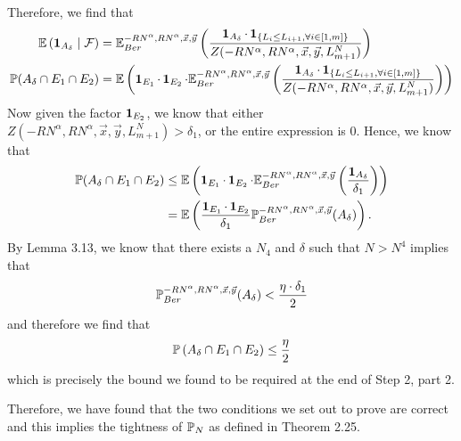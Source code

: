 	Therefore, we find that 
	\begin{align*}
	\mathbb{E}\left(\operatorname{\mathbf{1}}_{A_\delta}\mid \mathcal{F}\right)&=\mathbb{E}_{Ber}^{-RN^\alpha, RN^\alpha,\vec x,\vec y}\left(\frac{\operatorname{\mathbf{1}}_{A_\delta}\cdot \operatorname{\mathbf{1}}_{\left\{L_i\leq L_{i+1},\forall i\in [1,m]\right\}}}{Z(-RN^\alpha,RN^\alpha,\vec x, \vec y, L_{m+1}^N)}\right)
	\\
	\mathbb{P}(A_\delta\cap E_1\cap E_2)&=\mathbb{E}\left(\operatorname{\mathbf{1}}_{E_1}\cdot\operatorname{\mathbf{1}}_{E_2}\cdot \mathbb{E}_{Ber}^{-RN^\alpha, RN^\alpha,\vec x,\vec y}\left(\frac{\operatorname{\mathbf{1}}_{A_\delta}\cdot \operatorname{\mathbf{1}}_{\left\{L_i\leq L_{i+1},\forall i\in [1,m]\right\}}}{Z(-RN^\alpha,RN^\alpha,\vec x, \vec y, L_{m+1}^N)}\right)\right)
	\end{align*}
	Now given the factor $\operatorname{\mathbf{1}}_{E_2}$, we know that either $Z(-RN^\alpha,RN^\alpha,\vec x,\vec y, L_{m+1}^N)>\delta_1$, or the entire expression is $0$. Hence, we know that 
	\begin{align*}
	\mathbb{P}(A_\delta\cap E_1\cap E_2)&\leq \mathbb{E}\left(\operatorname{\mathbf{1}}_{E_1}\cdot\operatorname{\mathbf{1}}_{E_2}\cdot\mathbb{E}_{Ber}^{-RN^\alpha,RN^\alpha,\vec x,\vec y}\left(\frac{\operatorname{\mathbf{1}}_{A_\delta}}{\delta_1}\right)\right)\\
	&=\mathbb{E}\left(\frac{\operatorname{\mathbf{1}}_{E_1}\cdot \operatorname{\mathbf{1}}_{E_2}}{\delta_1}\mathbb{P}_{Ber}^{-RN^\alpha,RN^\alpha,\vec x,\vec y}(A_\delta)\right).
	\end{align*}
	By Lemma 3.13, we know that there exists a $N_4$ and $\delta$ such that $N>N^4$ implies that
	\[\mathbb{P}_{Ber}^{-RN^\alpha,RN^\alpha,\vec x,\vec y}(A_\delta)<\frac{\eta\cdot\delta_1}2\] and therefore we find that $$\mathbb{P}\left(A_\delta\cap E_1\cap E_2\right)\leq \frac{\eta}{2}$$ which is precisely the bound we found to be required at the end of Step 2, part 2. 
	
	Therefore, we have found that the two conditions we set out to prove are correct and this implies the tightness of $\mathbb{P}_N$ as defined in Theorem 2.25.

